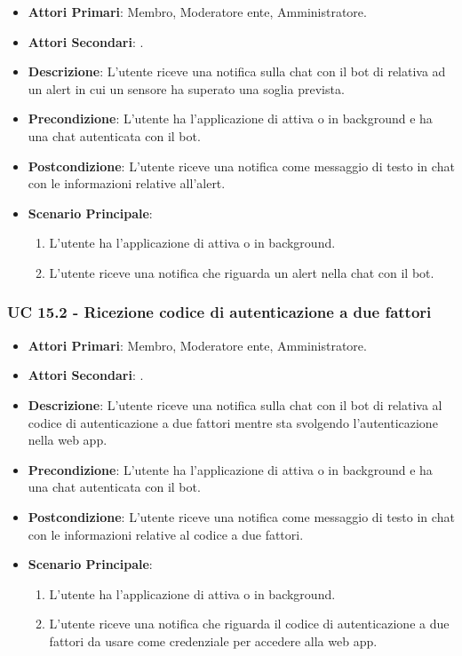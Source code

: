 	\begin{itemize}
		\item \textbf{Attori Primari}: Membro, Moderatore ente, Amministratore.
		\item \textbf{Attori Secondari}: .
		\item \textbf{Descrizione}: L'utente riceve una notifica sulla chat con il bot di  relativa ad un alert in cui un sensore ha superato una soglia prevista.
		\item \textbf{Precondizione}: L'utente ha l'applicazione di  attiva o in background e ha una chat autenticata con il bot.
		\item \textbf{Postcondizione}: L'utente riceve una notifica come messaggio di testo in chat con le informazioni relative all'alert.
		\item \textbf{Scenario Principale}:
		\begin{enumerate}
			\item L'utente ha l'applicazione di  attiva o in background.
			\item L'utente riceve una notifica che riguarda un alert nella chat con il bot.
		\end{enumerate}
	\end{itemize}

	\subsubsection{UC 15.2 - Ricezione codice di autenticazione a due fattori}

	\begin{itemize}
		\item \textbf{Attori Primari}: Membro, Moderatore ente, Amministratore.
		\item \textbf{Attori Secondari}: .
		\item \textbf{Descrizione}: L'utente riceve una notifica sulla chat con il bot di  relativa al codice di autenticazione a due fattori mentre sta svolgendo l'autenticazione nella web app.
		\item \textbf{Precondizione}: L'utente ha l'applicazione di  attiva o in background e ha una chat autenticata con il bot.
		\item \textbf{Postcondizione}: L'utente riceve una notifica come messaggio di testo in chat con le informazioni relative al codice a due fattori.
		\item \textbf{Scenario Principale}:
		\begin{enumerate}
			\item L'utente ha l'applicazione di  attiva o in background.
			\item L'utente riceve una notifica che riguarda il codice di autenticazione a due fattori da usare come credenziale per accedere alla web app.
		\end{enumerate}
	\end{itemize}